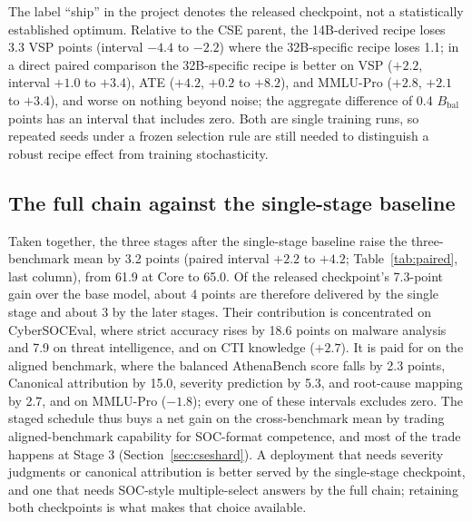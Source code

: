 \documentclass[twocolumn]{svjour3}
\newcommand{\Bbal}{B_{\mathrm{bal}}}
\begin{document}
The label ``ship'' in the project denotes the released checkpoint, not a statistically established optimum. Relative to the CSE parent, the 14B-derived recipe loses 3.3 VSP points (interval $-4.4$ to $-2.2$) where the 32B-specific recipe loses 1.1; in a direct paired comparison the 32B-specific recipe is better on VSP ($+2.2$, interval $+1.0$ to $+3.4$), ATE ($+4.2$, $+0.2$ to $+8.2$), and MMLU-Pro ($+2.8$, $+2.1$ to $+3.4$), and worse on nothing beyond noise; the aggregate difference of 0.4 $\Bbal$ points has an interval that includes zero. Both are single training runs, so repeated seeds under a frozen selection rule are still needed to distinguish a robust recipe effect from training stochasticity.

\subsection{The full chain against the single-stage baseline}\label{sec:fullchain}
Taken together, the three stages after the single-stage baseline raise the three-benchmark mean by 3.2 points (paired interval $+2.2$ to $+4.2$; Table~\ref{tab:paired}, last column), from 61.9 at Core to 65.0. Of the released checkpoint's 7.3-point gain over the base model, about 4 points are therefore delivered by the single stage and about 3 by the later stages. Their contribution is concentrated on CyberSOCEval, where strict accuracy rises by 18.6 points on malware analysis and 7.9 on threat intelligence, and on CTI knowledge ($+2.7$). It is paid for on the aligned benchmark, where the balanced AthenaBench score falls by 2.3 points, Canonical attribution by 15.0, severity prediction by 5.3, and root-cause mapping by 2.7, and on MMLU-Pro ($-1.8$); every one of these intervals excludes zero. The staged schedule thus buys a net gain on the cross-benchmark mean by trading aligned-benchmark capability for SOC-format competence, and most of the trade happens at Stage 3 (Section~\ref{sec:cseshard}). A deployment that needs severity judgments or canonical attribution is better served by the single-stage checkpoint, and one that needs SOC-style multiple-select answers by the full chain; retaining both checkpoints is what makes that choice available.
\end{document}
